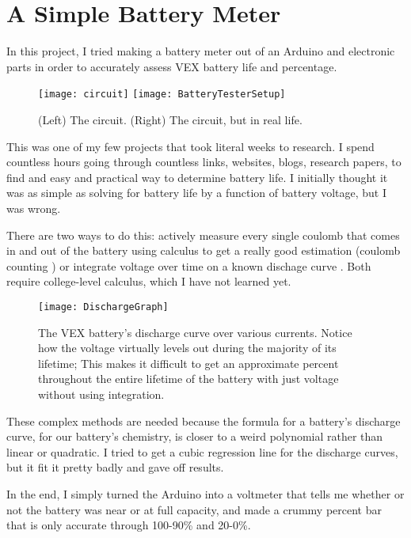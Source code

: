 \section{A Simple Battery Meter}
In this project, I tried making a battery meter out of an Arduino and electronic parts in order to accurately assess VEX battery life and percentage.

\begin{figure}[h]
    \centering
    \texttt{[image: circuit]}
    \texttt{[image: BatteryTesterSetup]}
    \caption{
        (Left) The circuit. (Right) The circuit, but in real life.
    }
\end{figure}

This was one of my few projects that took literal weeks to research. I spend countless hours going through countless links, websites, blogs, research papers, to find and easy and practical way to determine battery life. I initially thought it was as simple as solving for battery life by a function of battery voltage, but I was wrong.

There are two ways to do this: actively measure every single coulomb that comes in and out of the battery using calculus to get a really good estimation (coulomb counting \cite{CoulombCounting}) or integrate voltage over time on a known dischage curve \cite{IntegrationVoltage}. Both require college-level calculus, which I have not learned yet.

\begin{figure}[h]
    \centering
    \texttt{[image: DischargeGraph]}
    \caption{
        The VEX battery's discharge curve over various currents. Notice how the voltage virtually levels out during the majority of its lifetime; This makes it difficult to get an approximate percent throughout the entire lifetime of the battery with just voltage without using integration.
    }
\end{figure}

These complex methods are needed because the formula for a battery's discharge curve, for our battery's chemistry, is closer to a weird polynomial rather than linear or quadratic. I tried to get a cubic regression line for the discharge curves, but it fit it pretty badly and gave off results.

In the end, I simply turned the Arduino into a voltmeter that tells me whether or not the battery was near or at full capacity, and made a crummy percent bar that is only accurate through 100-90\% and 20-0\%.
